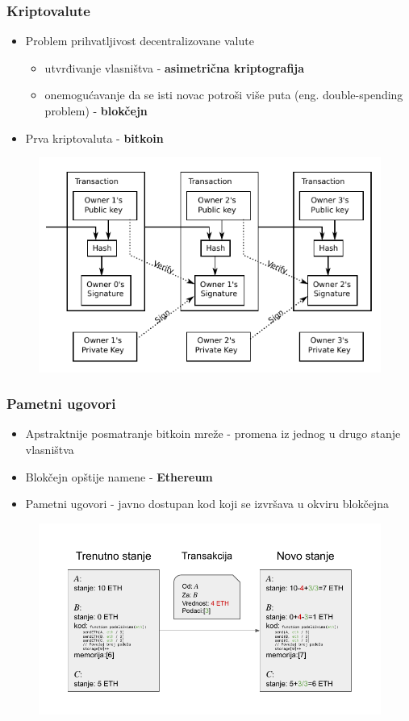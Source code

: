 \documentclass{beamer}
\begin{document}
\begin{frame}[fragile]\frametitle{Kriptovalute}
	\begin{itemize}
		\item Problem prihvatljivost decentralizovane valute
		\begin{itemize}
			\item utvrđivanje vlasništva - \textbf{asimetrična kriptografija}
			\item onemogućavanje da se isti novac potroši više puta (eng. double-spending problem) - \textbf{blokčejn}
		\end{itemize}
		\item Prva kriptovaluta - \textbf{bitkoin}
	\end{itemize}
	\begin{figure}[H]
		\includegraphics[scale=0.5]{Bitcoin_Transaction_Visual.pdf}
	\end{figure}
\end{frame}

\begin{frame}[fragile]\frametitle{Pametni ugovori}
	\begin{itemize}
		\item Apstraktnije posmatranje bitkoin mreže - promena iz jednog u drugo stanje vlasništva
		\item Blokčejn opštije namene - \textbf{Ethereum}
		\item Pametni ugovori - javno dostupan kod koji se izvršava u okviru blokčejna
	\end{itemize}

	\begin{figure}[H]
		\includegraphics[scale=0.55]{Ethereum_State_Transition.pdf}
	\end{figure}
\end{frame}
\end{document}
